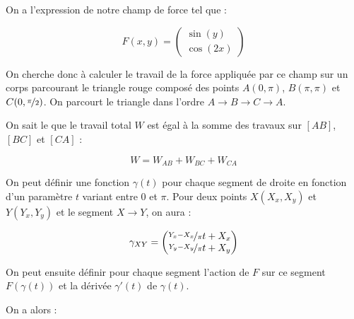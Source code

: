 \documentclass[a4paper, 11pt]{report} %
\begin{document}
On a l'expression de notre champ de force tel que :

\[
F(x, y) =
\begin{pmatrix}
\sin(y)\\
\cos(2x)
\end{pmatrix}
\]

On cherche donc à calculer le travail de la force appliquée par ce champ sur un corps parcourant le triangle rouge
composé des points $A(0, \pi)$, $B(\pi,\pi)$ et $C(0,\nicefrac{\pi}{2})$. On parcourt le triangle dans l'ordre $A
\rightarrow B \rightarrow C \rightarrow A$.

On sait le que le travail total $W$ est égal à la somme des travaux sur $[AB]$, $[BC]$ et $[CA]$ :

\[ W = W_{AB} + W_{BC} + W_{CA} \]

On peut définir une fonction $\gamma(t)$ pour chaque segment de droite en fonction d'un paramètre $t$ variant entre $0$
et $\pi$. Pour deux points $X(X_x, X_y)$ et $Y(Y_x, Y_y)$ et le segment $X \rightarrow Y$, on aura :

\[
\gamma_{XY} =
\begin{pmatrix}
\nicefrac{Y_x - X_x}{\pi}t+X_x\\
\nicefrac{Y_y - X_y}{\pi}t+X_y
\end{pmatrix}
\]

On peut ensuite définir pour chaque segment l'action de $F$ sur ce segment $F(\gamma(t))$ et la dérivée $\gamma'(t)$ de
$\gamma(t)$.

On a alors :
\end{document}
